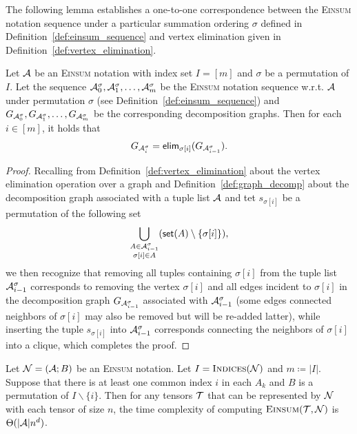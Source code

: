 \documentclass[letterpaper,11pt]{article}
\newcommand{\Zhang}[1]{{\color{blue}{Zhang: #1}}}
\def\Einsum{\textsc{Einsum}}
\newcommand{\takesetp}[1]{\mathsf{set}(#1)}
\newcommand{\indexset}{\textsc{Indices}}
\newcommand{\tensorcontraction}{\textsc{Einsum}}
\newcommand{\graphform}[1]{G_{#1}}
\newcommand{\appequal}{\Theta}
\newcommand{\eliminatevg}[2]{\mathsf{elim}_{#1}(#2)}
\begin{document}
\begin{bibunit}[plainnat]
The following lemma establishes a one-to-one correspondence between the \Einsum{} notation sequence under a particular summation ordering $\sigma$ defined in Definition~\ref{def:einsum_sequence} and vertex elimination given in Definition~\ref{def:vertex_elimination}.

\begin{lemma}
\label{lem:einsum_graph_seq}
Let ${\mathcal{A}}$ be an \Einsum{} notation with index set $I = [m]$ and $\sigma$ be a permutation of $I$. Let the sequence ${\mathcal{A}}^{\sigma}_0, {\mathcal{A}}^{\sigma}_1, \ldots, {\mathcal{A}}^{\sigma}_m$ be the \Einsum{} notation sequence w.r.t. ${\mathcal{A}}$ under permutation $\sigma$ (see Definition~\ref{def:einsum_sequence}) and $\graphform{\calA^{\sigma}_0}, \graphform{\calA^{\sigma}_1}, \ldots, \graphform{\calA^{\sigma}_m}$ be the corresponding decomposition graphs. Then for each $i \in [m]$, it holds that
\begin{align*}
   \graphform{\calA^{\sigma}_i} = \eliminatevg{\sigma[i]}{\graphform{\calA^{\sigma}_{i-1}}}.
\end{align*}
\end{lemma}

\begin{proof}
Recalling from Definition~\ref{def:vertex_elimination} about the vertex elimination operation over a graph and Definition~\ref{def:graph_decomp} about the decomposition graph associated with a tuple list ${\mathcal{A}}$ and tet $s_{\sigma[i]}$ be a permutation of the following set 
\begin{equation*}
    \bigcup_{\substack{ A \in \calA^{\sigma}_{i-1} \\ \sigma[i] \in A}} (\takesetp{A} \setminus \{\sigma[i]\}), 
\end{equation*}
we then recognize that removing all tuples containing $\sigma[i]$ from the tuple list ${\mathcal{A}}^{\sigma}_{i - 1}$ corresponds to removing the vertex $\sigma[i]$ and all edges incident to $\sigma[i]$ in the decomposition graph $\graphform{\calA^{\sigma}_{i-1}}$ associated with ${\mathcal{A}}^{\sigma}_{i-1}$ (some edges connected neighbors of $\sigma[i]$ may also be removed but will be re-added latter), while inserting the tuple $s_{\sigma[i]}$ into ${\mathcal{A}}^{\sigma}_{i-1}$ corresponds connecting the neighbors of $\sigma[i]$ into a clique, which completes the proof. 
\end{proof}

\begin{lemma}
\label{lem:complexity_one_index}
Let ${\mathcal{N}} = ({\mathcal{A}}; B)$ be an \Einsum{} notation. Let $I = \indexset(\calN)$ and $m \coloneqq |I|$. Suppose that there is at least one common index $i$ in each $A_k$ and $B$ is a permutation of $I \backslash \{i\}$. Then for any tensors ${\mathcal{T}}$ that can be represented by ${\mathcal{N}}$ with each tensor of size $n$, the time complexity of computing $\tensorcontraction(\calT, \calN)$ is $\appequal(|\calA|n^{d})$.
\end{lemma}


\end{bibunit}
\end{document}
